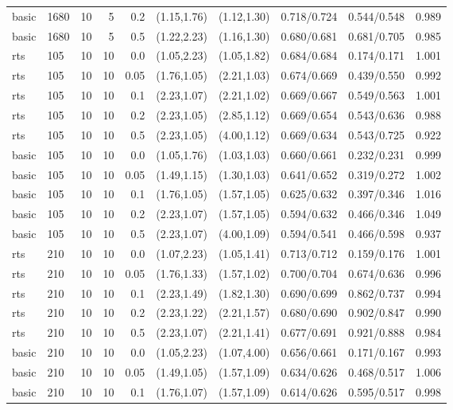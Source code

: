 \begin{tabular}{llrrrccccc}
basic & 1680 & 10 & 5 & 0.2 & (1.15,1.76) & (1.12,1.30) & 0.718/0.724 & 0.544/0.548 & 0.989 \\
basic & 1680 & 10 & 5 & 0.5 & (1.22,2.23) & (1.16,1.30) & 0.680/0.681 & 0.681/0.705 & 0.985 \\
rts & 105 & 10 & 10 & 0.0 & (1.05,2.23) & (1.05,1.82) & 0.684/0.684 & 0.174/0.171 & 1.001 \\
rts & 105 & 10 & 10 & 0.05 & (1.76,1.05) & (2.21,1.03) & 0.674/0.669 & 0.439/0.550 & 0.992 \\
rts & 105 & 10 & 10 & 0.1 & (2.23,1.07) & (2.21,1.02) & 0.669/0.667 & 0.549/0.563 & 1.001 \\
rts & 105 & 10 & 10 & 0.2 & (2.23,1.05) & (2.85,1.12) & 0.669/0.654 & 0.543/0.636 & 0.988 \\
rts & 105 & 10 & 10 & 0.5 & (2.23,1.05) & (4.00,1.12) & 0.669/0.634 & 0.543/0.725 & 0.922 \\
basic & 105 & 10 & 10 & 0.0 & (1.05,1.76) & (1.03,1.03) & 0.660/0.661 & 0.232/0.231 & 0.999 \\
basic & 105 & 10 & 10 & 0.05 & (1.49,1.15) & (1.30,1.03) & 0.641/0.652 & 0.319/0.272 & 1.002 \\
basic & 105 & 10 & 10 & 0.1 & (1.76,1.05) & (1.57,1.05) & 0.625/0.632 & 0.397/0.346 & 1.016 \\
basic & 105 & 10 & 10 & 0.2 & (2.23,1.07) & (1.57,1.05) & 0.594/0.632 & 0.466/0.346 & 1.049 \\
basic & 105 & 10 & 10 & 0.5 & (2.23,1.07) & (4.00,1.09) & 0.594/0.541 & 0.466/0.598 & 0.937 \\
rts & 210 & 10 & 10 & 0.0 & (1.07,2.23) & (1.05,1.41) & 0.713/0.712 & 0.159/0.176 & 1.001 \\
rts & 210 & 10 & 10 & 0.05 & (1.76,1.33) & (1.57,1.02) & 0.700/0.704 & 0.674/0.636 & 0.996 \\
rts & 210 & 10 & 10 & 0.1 & (2.23,1.49) & (1.82,1.30) & 0.690/0.699 & 0.862/0.737 & 0.994 \\
rts & 210 & 10 & 10 & 0.2 & (2.23,1.22) & (2.21,1.57) & 0.680/0.690 & 0.902/0.847 & 0.990 \\
rts & 210 & 10 & 10 & 0.5 & (2.23,1.07) & (2.21,1.41) & 0.677/0.691 & 0.921/0.888 & 0.984 \\
basic & 210 & 10 & 10 & 0.0 & (1.05,2.23) & (1.07,4.00) & 0.656/0.661 & 0.171/0.167 & 0.993 \\
basic & 210 & 10 & 10 & 0.05 & (1.49,1.05) & (1.57,1.09) & 0.634/0.626 & 0.468/0.517 & 1.006 \\
basic & 210 & 10 & 10 & 0.1 & (1.76,1.07) & (1.57,1.09) & 0.614/0.626 & 0.595/0.517 & 0.998 \\

\end{tabular}
